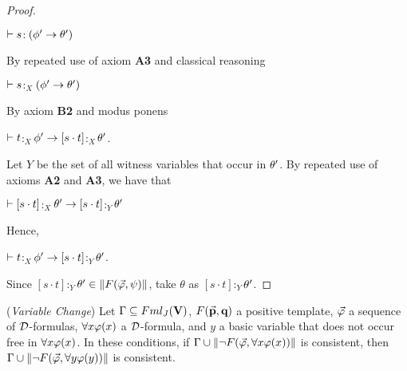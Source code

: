 \begin{proof}
	\begin{center}
		$\vdash s$$:$$(\phi^{\prime} \rightarrow \theta^{\prime})$
	\end{center}
By repeated use of axiom \textbf{A3} and classical reasoning  
	
	\begin{center}
		$\vdash s$$:_{X}$$(\phi^{\prime} \rightarrow \theta^{\prime})$
	\end{center}
By axiom \textbf{B2} and modus ponens 
	
	\begin{center}
		$\vdash t$$:_{X}$$\phi^{\prime} \rightarrow [s\cdot t]$$:_{X}$$ \theta^{\prime}$.
	\end{center}
	
	
	\qquad Let $Y$ be the set of all witness variables that occur in $\theta^{\prime}$. By repeated use of axioms \textbf{A2} and \textbf{A3}, we have that
	
	
	\begin{center}
		$\vdash [s\cdot t]$$:_{X}$$ \theta^{\prime} \rightarrow [s\cdot t]$$:_{Y}$$ \theta^{\prime}$
	\end{center} 
Hence, 
	
	\begin{center}
		$\vdash t$$:_{X}$$\phi^{\prime} \rightarrow [s\cdot t]$$:_{Y}$$ \theta^{\prime}$.
	\end{center} 
	
	\qquad Since $[s\cdot t]$$:_{Y}$$ \theta^{\prime} \in \Arrowvert F(\vec{\varphi},\psi) \Arrowvert$, take $\theta$ as $[s\cdot t]$$:_{Y}$$ \theta^{\prime}$.
	
\end{proof}




\begin{coro}(\textit{Variable Change})
	Let $\Gamma \subseteq Fml_{J}(\textbf{V})$, $F(\vec{\textbf{p}},\textbf{q})$ a positive template, $\vec{\varphi}$ a sequence of $\mathcal{D}$-formulas, $\forall x \varphi(x)$ a $\mathcal{D}$-formula, and $y$ a basic variable that does not occur free in $\forall x \varphi(x)$. In these conditions, if $\Gamma \cup \Arrowvert \neg F(\vec{\varphi},\forall x\varphi(x)) \Arrowvert$ is consistent, then $\Gamma \cup \Arrowvert \neg F(\vec{\varphi},\forall y\varphi(y)) \Arrowvert$ is consistent.     
\end{coro}



